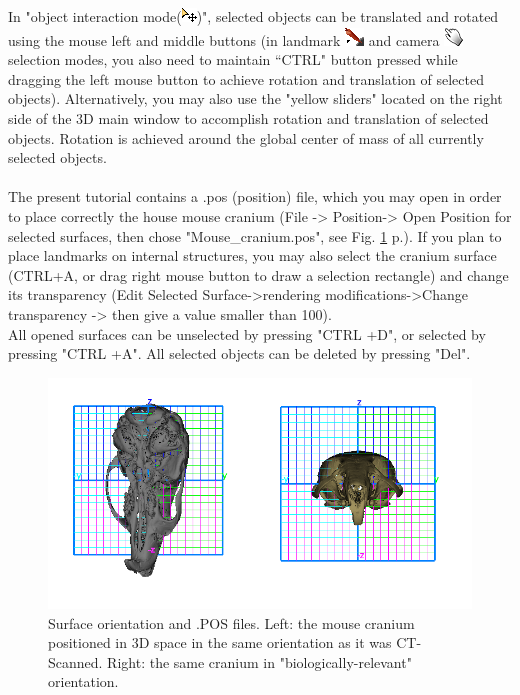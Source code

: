 \documentclass[12pt, a4paper]{book}
\begin{document}
In "object interaction mode(\includegraphics[scale=0.7]{../images/04/move_mode.png})", selected objects can be translated and rotated using the mouse left and middle buttons (in landmark \includegraphics[scale=0.7]{../images/04/Landmarks2.png} and camera  \includegraphics[scale=0.7]{../images/04/camera_mode.png} selection modes, you also need to maintain ``CTRL" button pressed while dragging the left mouse button to achieve rotation and translation of selected objects). Alternatively, you may also use the "yellow sliders" located on the right side of the 3D main window to accomplish rotation and translation of selected objects. Rotation is achieved around the global center of mass of all currently selected objects.\\
\\
The present tutorial contains a .pos (position) file, which you may open in order to place correctly the house
mouse cranium (File -> Position-> Open Position for selected surfaces, then chose "Mouse\_cranium.pos", see Fig. \ref{orientation} p.\pageref{orientation}). If you plan to place landmarks
on internal structures, you may also select the cranium surface (CTRL+A, or drag right mouse button to draw a selection rectangle) and change its transparency (Edit Selected Surface->rendering modifications->Change transparency -> then give a value smaller than 100).\\
All opened surfaces can be unselected by pressing "CTRL +D", or selected by pressing "CTRL +A". All selected objects can be deleted by pressing "Del".

\begin{figure}
  \centering
  \includegraphics[scale=0.4]{pos.png} 
	\caption{Surface orientation and .POS files.  Left: the mouse cranium positioned in 3D space in the same orientation as it was CT-Scanned. Right: the same cranium in "biologically-relevant" orientation.}
\label{orientation}
 
\end{figure}
\end{document}
